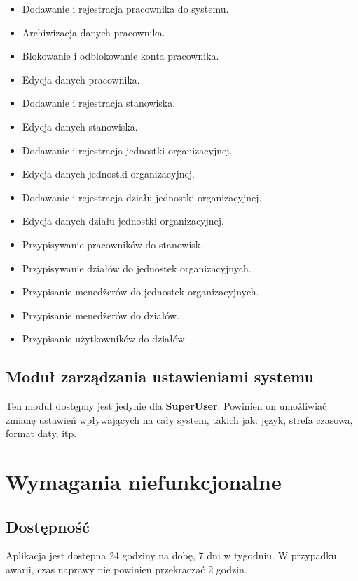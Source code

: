 \begin{itemize}
    \item {Dodawanie i rejestracja pracownika} do systemu.
    \item {Archiwizacja danych pracownika}.
    \item {Blokowanie i odblokowanie konta pracownika}.
    \item {Edycja danych pracownika}.
    \item {Dodawanie i rejestracja stanowiska}.
    \item {Edycja danych stanowiska}.
    \item {Dodawanie i rejestracja jednostki organizacyjnej}.
    \item {Edycja danych jednostki organizacyjnej}.
    \item {Dodawanie i rejestracja działu jednostki organizacyjnej}.
    \item {Edycja danych działu jednostki organizacyjnej}.
    \item {Przypisywanie pracowników do stanowisk}.
    \item {Przypisywanie działów do jednostek organizacyjnych}.
    \item {Przypisanie menedżerów do jednostek organizacyjnych}.
    \item {Przypisanie menedżerów do działów}.
    \item {Przypisanie użytkowników do działów}.
\end{itemize}

\subsection{Moduł zarządzania ustawieniami systemu}

Ten moduł dostępny jest jedynie dla \textbf{SuperUser}. Powinien on umożliwiać zmianę ustawień wpływających na cały system, takich jak: język, strefa czasowa, format daty, itp.

\section{Wymagania niefunkcjonalne}

\subsection{Dostępność}

Aplikacja jest dostępna 24 godziny na dobę, 7 dni w tygodniu. W przypadku awarii, czas naprawy nie powinien przekraczać 2 godzin.

